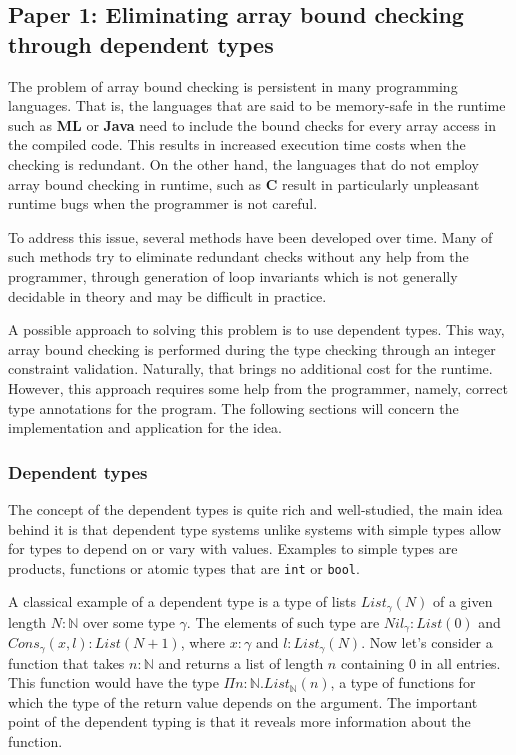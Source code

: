 \documentclass[a4paper,UKenglish]{lipics-v2016}
\begin{document}
\subsection{Paper 1: Eliminating array bound checking through dependent types}

The problem of array bound checking is persistent in many programming
languages. That is, the languages that are said to be memory-safe in the
runtime such as \textbf{ML} or \textbf{Java} need to include the bound checks
for every array access in the compiled code. This results in increased
execution time costs when the checking is redundant. On the other hand, the
languages that do not employ array bound checking in runtime, such as
\textbf{C} result in particularly unpleasant runtime bugs when the programmer
is not careful.

To address this issue, several methods have been developed over time. Many of
such methods try to eliminate redundant checks without any help from the
programmer, through generation of loop invariants which is not generally
decidable in theory and may be difficult in practice.

A possible approach to solving this problem is to use dependent types. This
way, array bound checking is performed during the type checking through an
integer constraint validation. Naturally, that brings no additional cost for
the runtime.  However, this approach requires some help from the programmer,
namely, correct type annotations for the program. The following sections will
concern the implementation and application for the idea.

\subsubsection{Dependent types}

The concept of the dependent types is quite rich and well-studied, the main
idea behind it is that dependent type systems unlike systems with simple types
allow for types to depend on or vary with values. Examples to simple types are
products, functions or atomic types that are \texttt{int} or \texttt{bool}.

A classical example of a dependent type is a type of lists $List_\gamma(N)$ of
a given length $N : \mathbb{N}$ over some type $\gamma$. The elements of such
type are $Nil_\gamma : List(0)$ and $Cons_\gamma(x, l) : List(N+1)$, where $x :
\gamma$ and $l : List_\gamma(N)$. Now let's consider a function that takes $n :
\mathbb{N}$ and returns a list of length $n$ containing $0$ in all entries.
This function would have the type $\Pi n : \mathbb{N}.List_\mathbb{N}(n)$, a
type of functions for which the type of the return value depends on the
argument.  The important point of the dependent typing is that it reveals more
information about the function.
\end{document}
